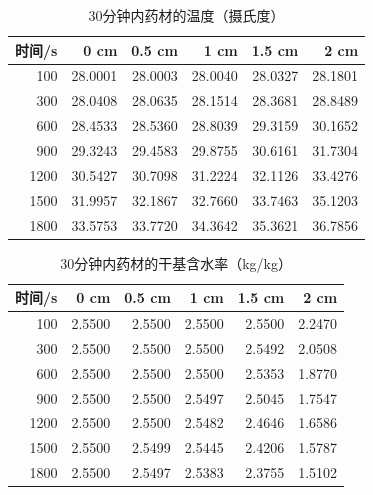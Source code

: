 \begin{table}[htbp]
\centering
\caption{30分钟内药材的温度（摄氏度）}
\begin{tabular}{rrrrrr}
\toprule
时间/s & 0 cm & 0.5 cm & 1 cm & 1.5 cm & 2 cm \\
\midrule
100 & 28.0001 & 28.0003 & 28.0040 & 28.0327 & 28.1801 \\
300 & 28.0408 & 28.0635 & 28.1514 & 28.3681 & 28.8489 \\
600 & 28.4533 & 28.5360 & 28.8039 & 29.3159 & 30.1652 \\
900 & 29.3243 & 29.4583 & 29.8755 & 30.6161 & 31.7304 \\
1200 & 30.5427 & 30.7098 & 31.2224 & 32.1126 & 33.4276 \\
1500 & 31.9957 & 32.1867 & 32.7660 & 33.7463 & 35.1203 \\
1800 & 33.5753 & 33.7720 & 34.3642 & 35.3621 & 36.7856 \\
\bottomrule
\end{tabular}
\end{table}

\begin{table}[htbp]
\centering
\caption{30分钟内药材的干基含水率（kg/kg）}
\begin{tabular}{rrrrrr}
\toprule
时间/s & 0 cm & 0.5 cm & 1 cm & 1.5 cm & 2 cm \\
\midrule
100 & 2.5500 & 2.5500 & 2.5500 & 2.5500 & 2.2470 \\
300 & 2.5500 & 2.5500 & 2.5500 & 2.5492 & 2.0508 \\
600 & 2.5500 & 2.5500 & 2.5500 & 2.5353 & 1.8770 \\
900 & 2.5500 & 2.5500 & 2.5497 & 2.5045 & 1.7547 \\
1200 & 2.5500 & 2.5500 & 2.5482 & 2.4646 & 1.6586 \\
1500 & 2.5500 & 2.5499 & 2.5445 & 2.4206 & 1.5787 \\
1800 & 2.5500 & 2.5497 & 2.5383 & 2.3755 & 1.5102 \\
\bottomrule
\end{tabular}
\end{table}

